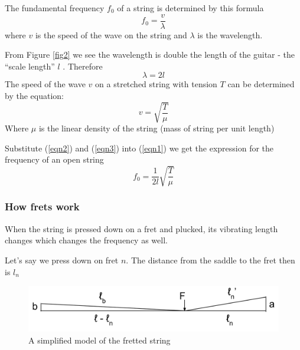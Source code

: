 \documentclass[11pt]{article}
\begin{document}
\begin{flushleft}
                The fundamental frequency $f_0$ of a string is determined by this formula
                \begin{equation}\label{eqn1}
                    f_0 = \frac{v}{\lambda}
                \end{equation}
                where $v$ is the speed of the wave on the string and $\lambda$ is the wavelength. \cite{eqn1} \par 
                From Figure \ref{fig2} we see the wavelength is double the length of the guitar - the “scale length” $l$ . Therefore \begin{equation}\label{eqn2}
                    \lambda = 2l
                \end{equation}
                The speed of the wave $v$ on a stretched string with tension $T$ can be determined by the equation:
                \begin{equation}\label{eqn3}
                    v = \sqrt{\frac{T}{\mu}} 
                \end{equation}
                Where $\mu$ is the linear density of the string (mass of string per unit length) \cite{eqn3}\par
                Substitute (\ref{eqn2}) and (\ref{eqn3}) into (\ref{eqn1}) we get the expression for the frequency of an open string
                \begin{equation}\label{eqn4}
                    f_0 = \frac{1}{2l}\sqrt{\frac{T}{\mu}}
                \end{equation}

            \subsubsection*{How frets work}
                When the string is pressed down on a fret and plucked, its vibrating length changes which  changes the frequency as well.\par
                Let's say we press down on fret $n$. The distance from the saddle to the fret then is $l_n$
                
                \begin{figure}[!ht]
                    \includegraphics[width=\textwidth]{fig3.png}
                    \caption{A simplified model of the fretted string}\label{fig3}
                \end{figure} 


\end{flushleft}
\end{document}
